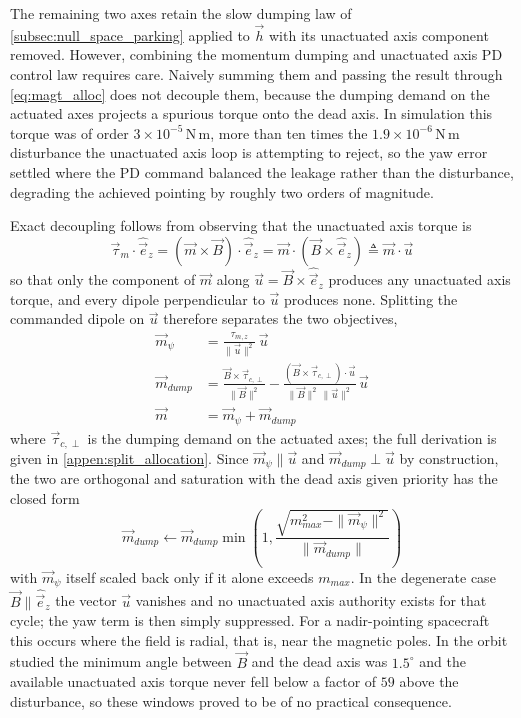The remaining two axes retain the slow dumping law of \autoref{subsec:null_space_parking} applied to $\vec{h}$ with its unactuated axis component removed. However, combining the momentum dumping and unactuated axis PD control law requires care. Naively summing them and passing the result through \autoref{eq:magt_alloc} does not decouple them, because the dumping demand on the actuated axes projects a spurious torque onto the dead axis. In simulation this torque was of order $3\times10^{-5}\,\mathrm{N\,m}$, more than ten times the $1.9\times10^{-6}\,\mathrm{N\,m}$ disturbance the unactuated axis loop is attempting to reject, so the yaw error settled where the PD command balanced the leakage rather than the disturbance, degrading the achieved pointing by roughly two orders of magnitude.

Exact decoupling follows from observing that the unactuated axis torque is
\begin{equation}
    \vec{\tau}_m\cdot\hat{\vec{e}}_z = (\vec{m}\times\vec{B})\cdot\hat{\vec{e}}_z = \vec{m}\cdot(\vec{B}\times\hat{\vec{e}}_z) \triangleq \vec{m}\cdot\vec{u}
    \label{eq:dead_axis_direction}
\end{equation}
so that only the component of $\vec{m}$ along $\vec{u} = \vec{B}\times\hat{\vec{e}}_z$ produces any unactuated axis torque, and every dipole perpendicular to $\vec{u}$ produces none. Splitting the commanded dipole on $\vec{u}$ therefore separates the two objectives,
\begin{align}
    \vec{m}_{\psi} &= \frac{\tau_{m,z}}{\|\vec{u}\|^2}\,\vec{u} \label{eq:m_yaw}\\
    \vec{m}_{dump} &= \frac{\vec{B}\times\vec{\tau}_{c,\perp}}{\|\vec{B}\|^2} - \frac{(\vec{B}\times\vec{\tau}_{c,\perp})\cdot\vec{u}}{\|\vec{B}\|^2\,\|\vec{u}\|^2}\,\vec{u} \label{eq:m_dump}\\
    \vec{m} &= \vec{m}_{\psi} + \vec{m}_{dump} \label{eq:m_total}
\end{align}
where $\vec{\tau}_{c,\perp}$ is the dumping demand on the actuated axes; the full derivation is given in \autoref{appen:split_allocation}. Since $\vec{m}_{\psi} \parallel \vec{u}$ and $\vec{m}_{dump} \perp \vec{u}$ by construction, the two are orthogonal and saturation with the dead axis given priority has the closed form
\begin{equation}
    \vec{m}_{dump} \leftarrow \vec{m}_{dump}\min\!\left(1, \frac{\sqrt{m_{max}^2 - \|\vec{m}_{\psi}\|^2}}{\|\vec{m}_{dump}\|}\right)
    \label{eq:priority_saturation}
\end{equation}
with $\vec{m}_{\psi}$ itself scaled back only if it alone exceeds $m_{max}$. In the degenerate case $\vec{B} \parallel \hat{\vec{e}}_z$ the vector $\vec{u}$ vanishes and no unactuated axis authority exists for that cycle; the yaw term is then simply suppressed. For a nadir-pointing spacecraft this occurs where the field is radial, that is, near the magnetic poles. In the orbit studied the minimum angle between $\vec{B}$ and the dead axis was $1.5^\circ$ and the available unactuated axis torque never fell below a factor of $59$ above the disturbance, so these windows proved to be of no practical consequence.

